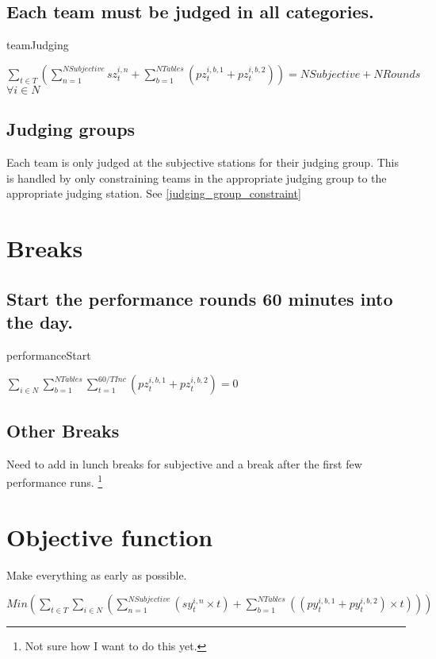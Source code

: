 \documentclass[letterpaper,11pt]{report}
\newcommand{\doccomment}[3]%
{\marginpar{\textcolor{#2}{\bf #1}}%
\footnote{{\color{#2}#3}}%
}
\newcommand{\doccomment}[3]{}
\newcommand{\jpscomment}[1]%
{\doccomment{SCHEWE}{Bittersweet}{#1}}
\begin{document}
\FloatBarrier
\subsection{Each team must be judged in all categories.}
\begin{algorithm}
\caption{teamJudging}
$\sum\limits_{t \in T} ( 
    \sum\limits_{n=1}^{NSubjective} sz_{t}^{i,n}  
 + \sum\limits_{b=1}^{NTables} (pz_{t}^{i,b,1} + pz_{t}^{i,b,2})
)
= NSubjective + NRounds$
\hfill $\forall i \in N$
\end{algorithm}

\FloatBarrier
\subsection{Judging groups}
Each team is only judged at the subjective stations for their judging
group. This is handled by only constraining teams in the appropriate
judging group to the appropriate judging station. See \autoref{judging_group_constraint}


\FloatBarrier
\section{Breaks}
\subsection{Start the performance rounds 60 minutes into the day.}
\begin{algorithm}
\caption{performanceStart}
$\sum\limits_{i \in N} \sum\limits_{b=1}^{NTables} 
    \sum\limits_{t = 1}^{60/TInc} 
      ( pz_{t}^{i,b,1} + pz_{t}^{i,b,2} ) = 0$
\end{algorithm}
    
\subsection{Other Breaks}
Need to add in lunch breaks for subjective and a break after the first few
performance runs. \jpscomment{Not sure how I want to do this yet.}

\section{Objective function}
Make everything as early as possible.

$Min ( 
\sum\limits_{t \in T}
  \sum\limits_{i \in N} (
    \sum\limits_{n=1}^{NSubjective}
      ( sy_{t}^{i,n} \times t )
  + \sum\limits_{b=1}^{NTables} ( ( py_{t}^{i,b,1} + py_{t}^{i,b,2} )
  \times t)
  )
) $
\end{document}

